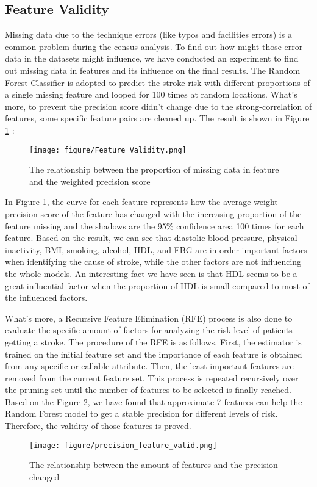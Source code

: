 \documentclass{article}
\begin{document}
\subsection{Feature Validity}
Missing data due to the technique errors (like typos and facilities errors) is a common problem during  the census analysis. To find out how might those error data in the datasets might influence, we have conducted an experiment to find out missing data in features and its influence on the final results.  The Random Forest Classifier is adopted to predict the stroke risk  with different proportions of a single missing feature and looped for 100 times
at random locations.  What's more, to prevent the precision score didn't change due to the strong-correlation of features, some specific feature pairs are cleaned up. The result is shown in Figure \ref{fig:feature_valid} :

\begin{figure}[H]
    \centering
    \texttt{[image: figure/Feature\_Validity.png]}
    \caption{The relationship between the proportion of missing data in feature and the weighted precision score}
    \label{fig:feature_valid}
\end{figure}

In Figure \ref{fig:feature_valid}, the curve for each feature represents how the average weight precision score of the feature has changed with the increasing proportion of the feature missing and the shadows are the 95\% confidence area 100 times for each feature. Based on the result, we can see that diastolic blood pressure, physical inactivity, BMI, smoking, alcohol, HDL, and FBG are in order important factors when identifying the cause of stroke, while the other factors are not influencing the whole models. An interesting fact we have seen is that HDL seems to be a great influential factor when the proportion of HDL is small compared to most of the influenced factors.

What's more, a Recursive Feature Elimination (RFE) process is also done to evaluate the specific amount of factors for analyzing the risk level of patients getting a stroke. The procedure of the RFE is as follows. First, the estimator is trained on the initial feature set and the importance of each feature is obtained from any specific or callable attribute. Then, the least important features are removed from the current feature set. This process is repeated recursively over the pruning set until the number of features to be selected is finally reached. Based on the Figure \ref{fig:feature_valid_precision}, we have found that approximate 7 features can help the Random Forest model to get a stable precision for different levels of risk. Therefore, the validity of those features is proved.
\begin{figure}[H]
    \centering
    \texttt{[image: figure/precision\_feature\_valid.png]}
    \caption{The relationship between the amount of features and the precision changed}
    \label{fig:feature_valid_precision}
\end{figure}



\end{document}
